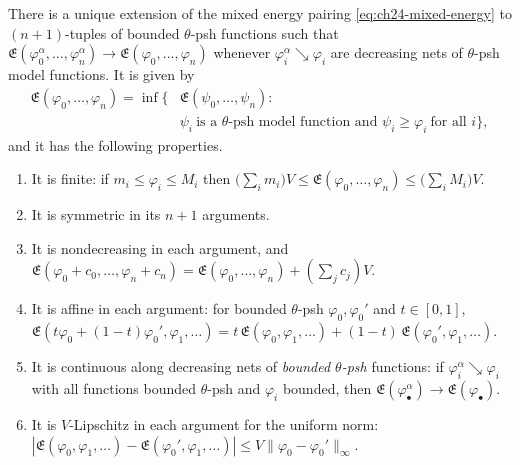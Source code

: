 \begin{theorem}
\label{thm:ch24-energy-extension}
There is a unique extension of the mixed energy pairing
\eqref{eq:ch24-mixed-energy} to $(n+1)$-tuples of bounded $\theta$-psh
functions such that
$\mathfrak E(\varphi^\alpha_0,\ldots,\varphi^\alpha_n)\to
 \mathfrak E(\varphi_0,\ldots,\varphi_n)$
whenever $\varphi_i^\alpha\searrow\varphi_i$ are decreasing nets of
$\theta$-psh model functions.  It is given by
\begin{equation}
\label{eq:ch24-energy-inf}
 \begin{aligned}
 \mathfrak E(\varphi_0,\ldots,\varphi_n)
 =\inf\bigl\{&\mathfrak E(\psi_0,\ldots,\psi_n):\\
 &\psi_i\ \text{is a $\theta$-psh model function and }
   \psi_i\geq\varphi_i\ \text{for all }i\bigr\},
 \end{aligned}
\end{equation}
and it has the following properties.
\begin{enumerate}
\item\label{itm:ch24-ee:finite} It is finite: if $m_i\leq\varphi_i\leq M_i$
 then
 $\bigl(\sum_im_i\bigr)V\leq\mathfrak E(\varphi_0,\ldots,\varphi_n)
   \leq\bigl(\sum_iM_i\bigr)V$.
\item\label{itm:ch24-ee:sym} It is symmetric in its $n+1$ arguments.
\item\label{itm:ch24-ee:mono} It is nondecreasing in each argument, and
 $\mathfrak E(\varphi_0+c_0,\ldots,\varphi_n+c_n)
   =\mathfrak E(\varphi_0,\ldots,\varphi_n)+(\sum_jc_j)V$.
\item\label{itm:ch24-ee:affine} It is affine in each argument: for bounded
 $\theta$-psh $\varphi_0,\varphi_0'$ and $t\in[0,1]$,
 $\mathfrak E(t\varphi_0+(1-t)\varphi_0',\varphi_1,\ldots)
  =t\,\mathfrak E(\varphi_0,\varphi_1,\ldots)
   +(1-t)\,\mathfrak E(\varphi_0',\varphi_1,\ldots)$.
\item\label{itm:ch24-ee:nets} It is continuous along decreasing nets of
 \emph{bounded $\theta$-psh} functions: if
 $\varphi_i^\alpha\searrow\varphi_i$ with all functions bounded
 $\theta$-psh and $\varphi_i$ bounded, then
 $\mathfrak E(\varphi_\bullet^\alpha)\to\mathfrak E(\varphi_\bullet)$.
\item\label{itm:ch24-ee:lip} It is $V$-Lipschitz in each argument for the
 uniform norm:
 $|\mathfrak E(\varphi_0,\varphi_1,\ldots)
  -\mathfrak E(\varphi_0',\varphi_1,\ldots)|
  \leq V\|\varphi_0-\varphi_0'\|_\infty$.
\end{enumerate}
\end{theorem}

